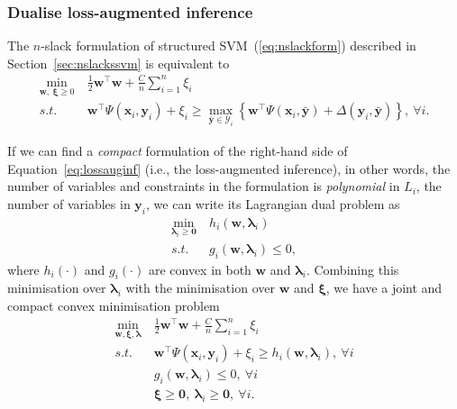 \documentclass[9pt]{extarticle}
\begin{document}
\subsubsection{Dualise loss-augmented inference}
\label{sec:dualinf}

The $n$-slack formulation of structured SVM~(\ref{eq:nslackform}) described in Section~\ref{sec:nslackssvm} is equivalent to
\begin{align}
\min_{\mathbf{w}, ~\bm{\xi} \ge 0} ~& \frac{1}{2} \mathbf{w}^\top \mathbf{w} + \frac{C}{n} \sum_{i=1}^n \xi_i \\
s.t.~~ ~& \mathbf{w}^\top \Psi(\mathbf{x}_i, \mathbf{y}_i) + \xi_i \ge
          \max_{\bar{\mathbf{y}} \in \mathcal{Y}_i} 
          \left\{\mathbf{w}^\top \Psi(\mathbf{x}_i, \bar{\mathbf{y}}) + \Delta(\mathbf{y}_i, \bar{\mathbf{y}}) \right\},~\forall i. \label{eq:lossauginf}
\end{align}

If we can find a \emph{compact} formulation of the right-hand side of Equation~\ref{eq:lossauginf} (i.e., the loss-augmented inference),
in other words, the number of variables and constraints in the formulation is \emph{polynomial} in $L_i$, the number of variables in $\mathbf{y}_i$,
we can write its Lagrangian dual problem as 
\begin{align*}
\min_{\bm{\lambda}_i \ge \mathbf{0}} ~& h_i(\mathbf{w}, \bm{\lambda}_i) \\
s.t.~~ ~& g_i(\mathbf{w}, \bm{\lambda}_i) \le 0,
\end{align*}
where $h_i(\cdot)$ and $g_i(\cdot)$ are convex in both $\mathbf{w}$ and $\bm{\lambda}_i$.
Combining this minimisation over $\bm{\lambda}_i$ with the minimisation over $\mathbf{w}$ and $\bm{\xi}$,
we have a joint and compact convex minimisation problem
\begin{equation}
\label{eq:dualinf}
\begin{aligned}
\min_{\mathbf{w}, \bm{\xi}, \bm{\lambda}} ~& \frac{1}{2} \mathbf{w}^\top \mathbf{w} + \frac{C}{n} \sum_{i=1}^n \xi_i \\
s.t.~~ ~& \mathbf{w}^\top \Psi(\mathbf{x}_i, \mathbf{y}_i) + \xi_i \ge h_i(\mathbf{w}, \bm{\lambda}_i), ~\forall i \\
        & g_i(\mathbf{w}, \bm{\lambda}_i) \le 0, ~\forall i \\
        & \bm{\xi} \ge \mathbf{0}, ~\bm{\lambda}_i \ge \mathbf{0}, ~\forall i.
\end{aligned}
\end{equation}
\end{document}
